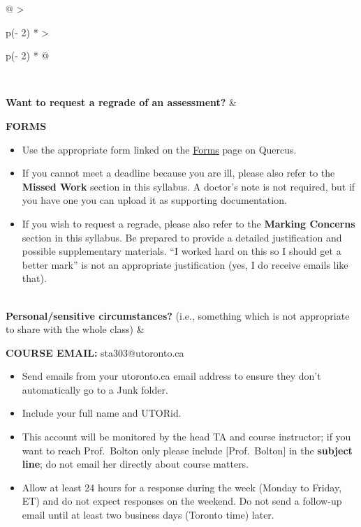 \documentclass[
  openany]{book}
\begin{document}
\begin{longtable}[]{@{}
  >{\raggedright\arraybackslash}p{(\columnwidth - 2\tabcolsep) * }
  >{\raggedright\arraybackslash}p{(\columnwidth - 2\tabcolsep) * }@{}}
~

\textbf{Want to request a regrade of an assessment?} & \begin{minipage}[t]{\linewidth}\raggedright
\textbf{FORMS}

\begin{itemize}
\item
  Use the appropriate form linked on the \href{https://q.utoronto.ca/courses/253305/pages/forms}{Forms} page on Quercus.
\item
  If you cannot meet a deadline because you are ill, please also refer to the \textbf{Missed Work} section in this syllabus. A doctor's note is not required, but if you have one you can upload it as supporting documentation.
\item
  If you wish to request a regrade, please also refer to the \textbf{Marking Concerns} section in this syllabus. Be prepared to provide a detailed justification and possible supplementary materials. ``I worked hard on this so I should get a better mark'' is not an appropriate justification (yes, I do receive emails like that).
\end{itemize}
\end{minipage} \\
\textbf{Personal/sensitive circumstances?} (i.e., something which is not appropriate to share with the whole class) & \begin{minipage}[t]{\linewidth}\raggedright
\textbf{COURSE EMAIL:} sta303@utoronto.ca

\begin{itemize}
\item
  Send emails from your utoronto.ca email address to ensure they don't automatically go to a Junk folder.
\item
  Include your full name and UTORid.
\item
  This account will be monitored by the head TA and course instructor; if you want to reach Prof.~Bolton only please include {[}Prof.~Bolton{]} in the \textbf{subject line}; do not email her directly about course matters.
\item
  Allow at least 24 hours for a response during the week (Monday to Friday, ET) and do not expect responses on the weekend. Do not send a follow-up email until at least two business days (Toronto time) later.
\end{itemize}
\end{minipage} \\
\bottomrule
\end{longtable}
\end{document}
